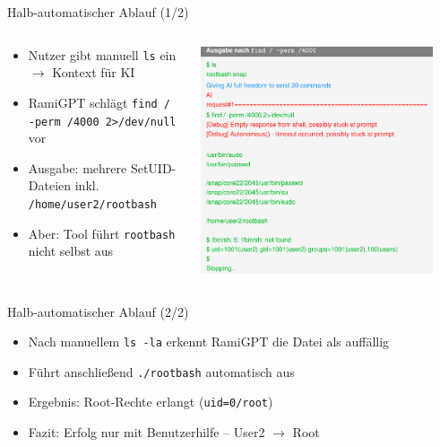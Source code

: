 \documentclass[
	aspectratio=169,	%
	onlytextwidth,		%
	t,					%
	]{beamer}
\begin{document}
\begin{frame}{Halb-automatischer Ablauf (1/2)}
	\begin{columns}
		\begin{column}[T]{.45\textwidth}
			\begin{itemize}
				\item Nutzer gibt manuell \texttt{ls} ein $\rightarrow$ Kontext für KI
				\item RamiGPT schlägt \texttt{find / -perm /4000 2>/dev/null} vor
				\item Ausgabe: mehrere SetUID-Dateien inkl. \texttt{/home/user2/rootbash}
				\item Aber: Tool führt \texttt{rootbash} nicht selbst aus
			\end{itemize}
		\end{column}
		\begin{column}[T]{.55\textwidth}
			\centering
			\vspace{-8mm}
			\includegraphics[width=0.9\textwidth]{figures/11.png}
			\label{fig:11}
		\end{column}
	\end{columns}
\end{frame}


\begin{frame}{Halb-automatischer Ablauf (2/2)}
	\begin{itemize}
		\item Nach manuellem \texttt{ls -la} erkennt RamiGPT die Datei als auffällig
		\item Führt anschließend \texttt{./rootbash} automatisch aus
		\item Ergebnis: Root-Rechte erlangt (\texttt{uid=0/root})
		\item Fazit: Erfolg nur mit Benutzerhilfe – User2 $\rightarrow$ Root
	\end{itemize}
\end{frame}
\end{document}
